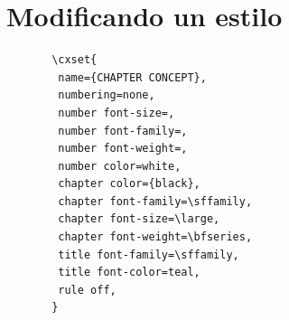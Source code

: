 \documentclass{book}
\def\cxset{\pgfqkeys{/chapter}} %
\begin{document}
       \section{Modificando un estilo}
       \begin{lstlisting}
       \cxset{
        name={CHAPTER CONCEPT},
        numbering=none,
        number font-size=,
        number font-family=,
        number font-weight=,
        number color=white,
        chapter color={black},
        chapter font-family=\sffamily,
        chapter font-size=\large,
        chapter font-weight=\bfseries,
        title font-family=\sffamily,
        title font-color=teal,
        rule off,
       }
       \end{lstlisting}

       
\end{document}
